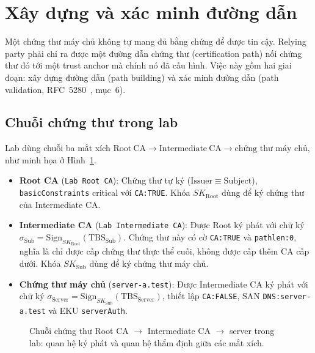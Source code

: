 \section{Xây dựng và xác minh đường dẫn}
\label{sec:path-validation}

Một chứng thư máy chủ không tự mang đủ bằng chứng để được tin cậy. Relying party phải chỉ ra được một đường dẫn chứng thư (certification path) nối chứng thư đó tới một trust anchor mà chính nó đã cấu hình. Việc này gồm hai giai đoạn: xây dựng đường dẫn (path building) và xác minh đường dẫn (path validation, RFC~5280~\cite{rfc5280}, mục~6).

\subsection{Chuỗi chứng thư trong lab}
\label{subsec:lab-trust-chain}

Lab dùng chuỗi ba mắt xích $\mathrm{Root\ CA} \rightarrow \mathrm{Intermediate\ CA} \rightarrow \text{chứng thư máy chủ}$, như minh họa ở Hình~\ref{fig:trust-chain-validation}.
\begin{itemize}
    \item \textbf{Root CA} (\texttt{Lab Root CA}): Chứng thư tự ký ($\mathrm{Issuer} \equiv \mathrm{Subject}$), \texttt{basicConstraints} critical với \texttt{CA:TRUE}. Khóa $SK_{\mathrm{Root}}$ dùng để ký chứng thư của Intermediate CA.
    \item \textbf{Intermediate CA} (\texttt{Lab Intermediate CA}): Được Root ký phát với chữ ký $\sigma_{\mathrm{Sub}} = \mathrm{Sign}_{SK_{\mathrm{Root}}}(\mathrm{TBS}_{\mathrm{Sub}})$. Chứng thư này có cờ \texttt{CA:TRUE} và \texttt{pathlen:0}, nghĩa là chỉ được cấp chứng thư thực thể cuối, không được cấp thêm CA cấp dưới. Khóa $SK_{\mathrm{Sub}}$ dùng để ký chứng thư máy chủ.
    \item \textbf{Chứng thư máy chủ} (\texttt{server-a.test}): Được Intermediate CA ký phát với chữ ký $\sigma_{\mathrm{Server}} = \mathrm{Sign}_{SK_{\mathrm{Sub}}}(\mathrm{TBS}_{\mathrm{Server}})$, thiết lập \texttt{CA:FALSE}, SAN \texttt{DNS:server-a.test} và EKU \texttt{serverAuth}.
\end{itemize}

\clearpage

\begin{figure}[!htbp]
\centering

\caption{Chuỗi chứng thư Root CA $\rightarrow$ Intermediate CA $\rightarrow$ server trong lab: quan hệ ký phát và quan hệ thẩm định giữa các mắt xích.}
\label{fig:trust-chain-validation}
\end{figure}

